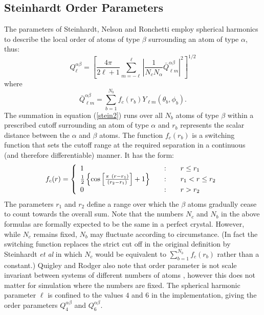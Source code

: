 \subsection{Steinhardt Order Parameters}
The parameters of Steinhardt, Nelson and Ronchetti \cite{steinhardt-83a}
employ spherical harmonics to describe the local order of atoms of type
$\beta$ surrounding an atom of type $\alpha$, thus:
\begin{equation}
Q_{\ell}^{\alpha\beta}=\left [\frac{4\pi}{2\ell+1} \sum_{m=-\ell}^{\ell}
\left | \frac{1}{N_{c}N_{\alpha}}\bar{Q}_{\ell m}^{\alpha\beta} \right |^{2}
\right ]^{1/2} \label{stein1}
\end{equation}
where 
\begin{equation}
\bar{Q}_{\ell m}^{\alpha\beta}=\sum_{b=1}^{N_{b}} f_{c}(r_{b})Y_{\ell
  m}(\theta_{b},\phi_{b}).\label{stein2}
\end{equation}
The summation in equation (\ref{stein2}) runs over all $N_{b}$ atoms of type
$\beta$ within a prescribed cutoff surrounding an atom of type $\alpha$ and
$r_{b}$ represents the scalar distance between the $\alpha$ and $\beta$ atoms.
The function $f_{c}(r_{b})$ is a switching function that sets the cutoff range
at the required separation in a continuous (and therefore differentiable)
manner. It has the form:
\begin{equation}
f_{c}(r) = \left\{ \begin{array} {l@{\qquad:\qquad}l}
1 & r \le r_{1} \\
\frac{1}{2} \left \{\cos \left
    [\frac{\pi~(r-r_{1})}{(r_{2}-r_{1})}\right]+1\right \} & r_{1} < r \le r_{2} \\
0 & r > r_{2}
\end{array} \right.\label{stein3}
\end{equation}
The parameters $r_{1}$ and $r_{2}$ define a range over which the $\beta$ atoms
gradually cease to count towards the overall sum.  Note that the numbers
$N_{c}$ and $N_{b}$ in the above formulas are formally expected to be the same
in a perfect crystal.  However, while $N_{c}$ remains fixed, $N_{b}$ may
fluctuate according to circumstance. (In fact the switching function replaces
the strict cut off in the original definition by Steinhardt {\em et al} in
which $N_{c}$ would be equivalent to $\sum_{b=1}^{N_{b}}f_{c}(r_{b})$ rather
than a constant.)  Quigley and Rodger also note that order parameter is not
scale invariant between systems of different numbers of atoms
\cite{quigley-09a}, however this does not matter for simulation where the
numbers are fixed.  The
spherical harmonic parameter $\ell$ is confined to the values $4$ and $6$ in
the \D{} implementation, giving the order parameters $Q_{4}^{\alpha\beta}$ and
$Q_{6}^{\alpha\beta}$.

